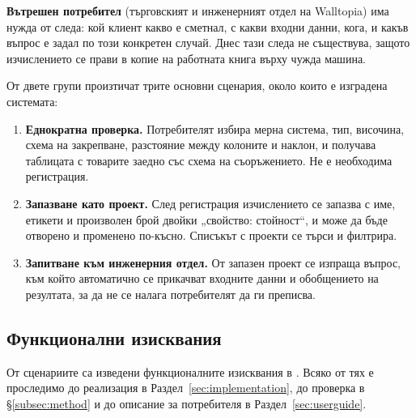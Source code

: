 \textbf{Вътрешен потребител} (търговският и инженерният отдел на Walltopia) има нужда
от следа: кой клиент какво е сметнал, с какви входни данни, кога, и какъв въпрос е
задал по този конкретен случай. Днес тази следа не съществува, защото изчислението се
прави в копие на работната книга върху чужда машина.

От двете групи произтичат трите основни сценария, около които е изградена системата:

\begin{enumerate}[topsep=2pt,itemsep=2pt,leftmargin=*]
\item \textbf{Еднократна проверка.} Потребителят избира мерна система, тип, височина,
      схема на закрепване, разстояние между колоните и наклон, и получава таблицата с
      товарите заедно със схема на съоръжението. Не е необходима регистрация.
\item \textbf{Запазване като проект.} След регистрация изчислението се запазва с име,
      етикети и произволен брой двойки „свойство: стойност“, и може да бъде отворено и
      променено по-късно. Списъкът с проекти се търси и филтрира.
\item \textbf{Запитване към инженерния отдел.} От запазен проект се изпраща въпрос,
      към който автоматично се прикачват входните данни и обобщението на резултата, за
      да не се налага потребителят да ги преписва.
\end{enumerate}

\subsection{Функционални изисквания}
\label{subsec:fr}

От сценариите са изведени функционалните изисквания в . Всяко от тях е
проследимо до реализация в Раздел~\ref{sec:implementation}, до проверка в
§\ref{subsec:method} и до описание за потребителя в Раздел~\ref{sec:userguide}.

